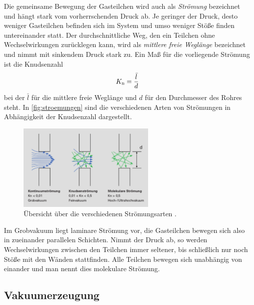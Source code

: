 Die gemeinsame Bewegung der Gasteilchen wird auch als \textit{Strömung} bezeichnet und hängt stark vom vorherrschenden Druck ab.
Je geringer der Druck, desto weniger Gasteilchen befinden sich im System und umso weniger Stöße finden untereinander statt.
Der durchschnittliche Weg, den ein Teilchen ohne Wechselwirkungen zurücklegen kann, wird als \textit{mittlere freie Weglänge} bezeichnet
und nimmt mit sinkendem Druck stark zu.
Ein Maß für die vorliegende Strömung ist die Knudsenzahl
\begin{equation}
    \notag
    K_{\text{n}} = \frac{\bar{l}}{d}
\end{equation}
bei der $\bar{l}$ für die mittlere freie Weglänge und $d$ für den Durchmesser des Rohres steht.
In \autoref{fig:stroemungen} sind die verschiedenen Arten von Strömungen in Abhängigkeit der Knudsenzahl
dargestellt.
\begin{figure}[H]
    \centering
    \includegraphics[width=0.6\textwidth]{content/pics/stroemung.png}
    \caption{Übersicht über die verschiedenen Strömungsarten \cite{Pfeiffer_Vakuum}.}
    \label{fig:stroemungen}
\end{figure}
Im Grobvakuum liegt laminare Strömung vor, die Gasteilchen bewegen sich also in zueinander parallelen Schichten.
Nimmt der Druck ab, so werden Wechselwirkungen zwischen den Teilchen immer seltener, bis schließlich nur noch
Stöße mit den Wänden stattfinden. Alle Teilchen bewegen sich unabhängig von einander und man nennt dies molekulare
Strömung.

\subsection{Vakuumerzeugung}

